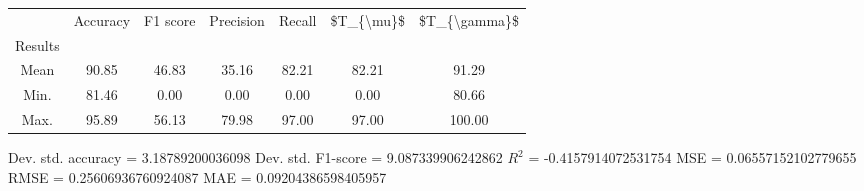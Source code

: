 \begin{tabular}{|c|c|c|c|c|c|c|}
\toprule
{} &  Accuracy &  F1 score &  Precision &  Recall &  \$T\_\{\textbackslash mu\}\$ &  \$T\_\{\textbackslash gamma\}\$ \\
Results &           &           &            &         &            &               \\
\hline
Mean    &     90.85 &     46.83 &      35.16 &   82.21 &      82.21 &         91.29 \\
Min.    &     81.46 &      0.00 &       0.00 &    0.00 &       0.00 &         80.66 \\
Max.    &     95.89 &     56.13 &      79.98 &   97.00 &      97.00 &        100.00 \\
\bottomrule
\end{tabular}

 Dev. std. accuracy = 3.18789200036098
 Dev. std. F1-score = 9.087339906242862
 $R^2$ = -0.4157914072531754
 MSE = 0.06557152102779655
 RMSE = 0.25606936760924087
 MAE = 0.09204386598405957